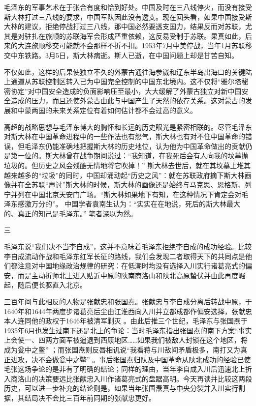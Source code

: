 \documentclass[UTF8, 12pt, a4paper]{ctexrep}
\begin{document}
毛泽东的军事艺术在于张合有度和恰到好处。中国及时在三八线停火，而没有接受斯大林打过三八线的要求，中国军队因此没有透支。现在回头看，如果中国接受斯大林的建议，拒绝停战打过三八线，那中国必然要透支国力，结果反而对苏联，尤其是对驻扎在旅顺的苏联海军会形成严重依赖，这反易受制于苏联。果真如此，后来的大连旅顺移交可能就不会那样不折不扣。1953年7月中美停战，当年1月苏联移交中东铁路。3月5日，斯大林病逝。斯人已逝，在中国问题上却是甘苦自知。

不仅如此，这样的后果使独立不久的外蒙古通往海参崴和辽东半岛出海口的关键陆上通道从苏联控制区转入已为中国完全控制的中国东北境内。这不仅将“雅尔塔秘密协定”对中国安全造成的负面影响压至最小，大大缓解了外蒙古独立对新中国安全造成的压力，而且还使外蒙古由此与中国产生了天然的依存关系。这对蒙古的发展和中蒙两国的未来关系定位有着如何估计都不会过高的意义。

高超的战略思想与毛泽东博大的胸怀和长远的历史眼光是紧密相联的。尽管毛泽东对斯大林在中国革命进程中的一些作法也有怨气，斯大林也有对不住中国革命的错误，但毛泽东仍能准确地把握斯大林的历史地位，认为他为中国革命做出的贡献仍是第一位的。斯大林曾在战争期间说过：“我知道，在我死后会有人向我的坟墓抛垃圾的。但历史之风会残酷无情地将它吹掉！” 斯大林去世后，就在其坟墓上堆其越来越多的“垃圾”的同时，中国却涌动起“历史之风”：就在苏联政府摘下斯大林画像并在全苏联“声讨”斯大林的时候，斯大林的画像还是始终与马克思、恩格斯、列宁并列在中国北京天安门广场。“斯大林如果地下有知，在这种情况下肯定会对毛泽东感激万分的”。 中国学者袁南生认为：“实实在在地说，死后的斯大林最大的、真正的知己是毛泽东。” 笔者深以为然。

三

毛泽东说“我们决不当李自成”，这并不意味着毛泽东拒绝李自成的成功经验。比较李自成流动作战和毛泽东红军长征的路线，我们会发现二者取得天下的共同点是他们都注意对中国地缘政治规律的研究：在低潮时均没有选择入川实行诸葛亮式的偏安，而是主动折师北上进入贴近中原的陕南商洛山和陕北高原蛰伏并由此再度崛起，随后便长驱直入北京。

三百年间与此相反的人物是张献忠和张国焘。张献忠与李自成分离后转战中原，于1640年和1644年两度步诸葛亮后尘由江淮西向入川并立都成都作偏安选择，张献忠本人连同他的政权于1646年被清军剿灭 。由此后推三个世纪，毛泽东与张国焘于1935年6月也发生过南下还是北上的争论：当时毛泽东指出张国焘的南下方案“事实上会使一、四两方面军被逼退到西康地区……如果我们被敌人封锁在这个地区，将成为瓮中之鳖” ；而张国焘则反唇相讥说“我看蒋与川敌间矛盾极多，南打又为真正进攻，决不会做瓮中之鳖” 。事后张国焘归队及中国革命从陕北成功的经验已使毛张这场争论的是非有了明确的结论；同样的理由，当年李自成入川后迅速北上折入商洛山的决策要远比张献忠入川作诸葛亮式的盘踞高明。今天再读并比较这两段历史，可以进一步补充的结论则是，如果当年张国焘真与中央分裂并入川实行割据，其结局决不会比三百年前同期的张献忠更好。
\end{document}

